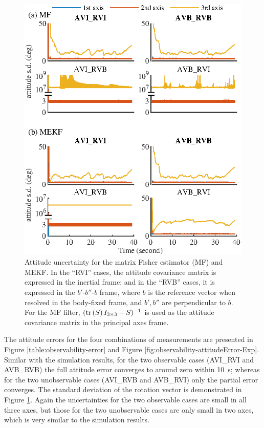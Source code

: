 \begin{figure}
	\centering
	\includegraphics[scale=1.4]{figures/observability/attitudeStd-Exp}
	\caption[Attitude uncertainty for the matrix Fisher estimator (MF) and MEKF.]{Attitude uncertainty for the matrix Fisher estimator (MF) and MEKF.
		In the ``RVI'' cases, the attitude covariance matrix is expressed in the inertial frame; and in the ``RVB'' cases, it is expressed in the $b'$-$b''$-$b$ frame, where $b$ is the reference vector when resolved in the body-fixed frame, and $b',b''$ are perpendicular to $b$.
		For the MF filter, $(\mathrm{tr}\left( S \right)I_{3\times 3}-S)^{-1}$ is used as the attitude covariance matrix in the principal axes frame. \label{fig:observability-attitudeStd-Exp}}
\end{figure}

The attitude errors for the four combinations of measurements are presented in Figure \ref{table:observability-error} and Figure \ref{fig:observability-attitudeError-Exp}.
Similar with the simulation results, for the two observable cases (AVI\_RVI and AVB\_RVB) the full attitude error converges to around zero within \SI{10}{\second}; whereas for the two unobservable cases (AVI\_RVB and AVB\_RVI) only the partial error converges.
The standard deviation of the rotation vector is demonstrated in Figure \ref{fig:observability-attitudeStd-Exp}.
Again the uncertainties for the two observable cases are small in all three axes, but those for the two unobservable cases are only small in two axes, which is very similar to the simulation results.

